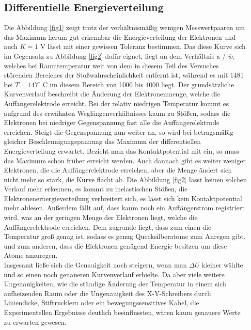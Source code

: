 %
%
\subsection{Differentielle Energieverteilung}
Die Abbildung \ref{fig1} zeigt trotz der verhältnismäßig wenigen Messwertpaaren
um das Maximum herum gut erkennbar die Energieverteilung der Elektronen und auch
$K=1$ V lässt mit einer gewissen Toleranz bestimmen. Das diese Kurve sich im Gegensatz 
zu Abbildung \ref{fig2} dafür eignet, liegt an dem Verhältnis a / $\overline w$, 
welches bei Raumtemperatur weit von dem in diesem Teil des Versuches störenden 
Bereiches der Stoßwahrscheinlichkeit entfernt ist, während es mit 1481 bei 
$T=147^{\circ}$ C im diesem Bereich von 1000 bis 4000 liegt. 
Der grundsätzliche Kurvenverlauf beschreibt die Änderung der Elektronenmenge, welche
die Auffängerelektrode erreicht. Bei der relativ niedrigen Temperatur kommt es aufgrund 
des erwähnten Weglängenverhältnisses kaum zu Stößen, sodass die Elektronen bei niedriger 
Gegenspannung fast alle die Auffängerelektrode erreichen. Steigt die Gegenspannung nun
weiter an, so wird bei betragsmäßig gleicher Beschleunigungspannung das Maximum der 
differentiellen Energieverteilung erwartet. Bezieht man das Kontaktpotential mit ein,
so muss das Maximum schon früher erreicht werden. Auch dannach gibt es weiter weniger Elektronen,
die die Auffängerelektrode erreichen, aber die Menge ändert sich nicht mehr so stark, die
Kurve flacht ab. Die Abbildung \ref{fig2} lässt keinen solchen Verlauf mehr erkennen, es
kommt zu inelastischen Stößen, die Elektronenernergieverteilung verbreitert sich, es  
lässt sich kein Kontaktpotential mehr ablesen. 
Außerdem fällt auf, dass  kaum noch ein Auffängerstrom 
registriert wird, was an der geringen Menge der Elektronen liegt, welche die Auffängerelektrode 
erreichen. Dem zugrunde liegt, dass zum einen die Temperatur groß genug ist, sodass es genug 
Quecksilberatome zum Anregen gibt, und zum anderen, dass die Elektronen genügend Energie
besitzen um diese Atome anzuregen.
\\
Insgesamt ließe sich die Genauigkeit noch steigern, wenn man $\Delta U$ kleiner wählte und
so einen noch genaueren Kurvenverlauf erhielte. Da aber viele weitere Ungenauigkeiten, wie
die ständige Änderung der Temperatur in einem sich aufheizenden Raum oder die Ungenauigkeit
des X-Y-Schreibers durch Liniendicke, Stiftrucklern oder ein bewegungssensitives 
Kabel, die Experimentellen Ergebnisse deutlich beeinflussten, wären kaum genauere 
Werte zu erwarten gewesen.

